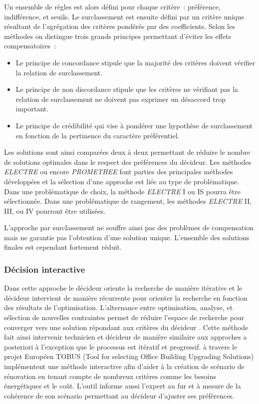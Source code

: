 Un ensemble de règles est alors défini pour chaque critère~: préférence, indifférence,
et seuils. Le surclassement est ensuite défini par un critère unique résultant de
l’agrégation des critères pondérés par des coefficients. Selon les méthodes on distingue
trois grands principes permettant d’éviter les effets compensatoires~:
\begin{itemize}
  \item Le principe de concordance stipule que la majorité des critères doivent
        vérifier la relation de surclassement.
  \item Le principe de non discordance stipule que les critères ne vérifiant pas
        la relation de surclassement ne doivent pas exprimer un désaccord trop
        important.
  \item Le principe de crédibilité qui vise à pondérer une hypothèse de surclassement
        en fonction de la pertinence du caractère préférentiel.
\end{itemize}
Les solutions sont ainsi comparées deux à deux permettant de réduire le nombre de
solutions optimales dans le respect des préférences du décideur. Les méthodes
\textit{ELECTRE} ou encore \textit{PROMETHEE} font parties des principales méthodes développées
et la sélection d’une approche est liée au type de problématique. Dans une problématique de
choix, la méthode \textit{ELECTRE} I ou IS pourra être sélectionnée. Dans une
problématique de rangement, les méthodes \textit{ELECTRE} II, III, ou IV pourront être
utilisées.

L’approche par surclassement ne souffre ainsi pas des problèmes de compensation
mais ne garantie pas l’obtention d’une solution unique. L’ensemble des solutions
finales est cependant fortement réduit.


\subsubsection{Décision interactive} %
\label{ssub:decision_interactive}
Dans cette approche le décideur oriente la recherche de manière itérative et le décideur
intervient de manière récurrente pour orienter la recherche en fonction des résultats de
l’optimisation. L’alternance entre optimisation, analyse, et sélection de nouvelles
contraintes permet de réduire l’espace de recherche pour converger vers une solution
répondant aux critères du décideur \parencite{Hwang1979}. Cette méthode fait ainsi
intervenir technicien et décideur de manière similaire aux approches a posteriori à
l’exception que le processus est itératif et progressif.
\textcite{Flourentzou2002185} à travers le projet Européen TOBUS (Tool for selecting Office Building
Upgrading Solutions) implémentent une méthode interactive afin d’aider
à la création de scénario de rénovation en tenant compte de nombreux critères comme les
besoins énergétiques et le coût. L’outil informe aussi l’expert au fur et à mesure de la
cohérence de son scénario permettant au décideur d’ajuster ses préférences.


